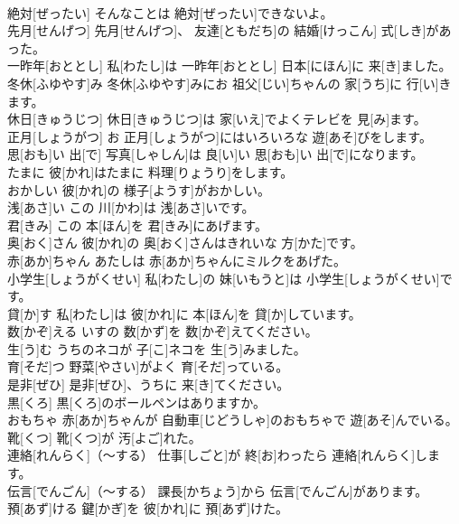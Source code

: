 \documentclass[8pt]{extreport}
\begin{document}
\begin{CJK}{UTF8}{min}
\\	絶対[ぜったい]	そんなことは 絶対[ぜったい]できないよ。		
\\	先月[せんげつ]	先月[せんげつ]、 友達[ともだち]の 結婚[けっこん] 式[しき]があった。		
\\	一昨年[おととし]	私[わたし]は 一昨年[おととし] 日本[にほん]に 来[き]ました。		
\\	冬休[ふゆやす]み	冬休[ふゆやす]みにお 祖父[じい]ちゃんの 家[うち]に 行[い]きます。		
\\	休日[きゅうじつ]	休日[きゅうじつ]は 家[いえ]でよくテレビを 見[み]ます。		
\\	正月[しょうがつ]	お 正月[しょうがつ]にはいろいろな 遊[あそ]びをします。		
\\	思[おも]い 出[で]	写真[しゃしん]は 良[い]い 思[おも]い 出[で]になります。		
\\	たまに	彼[かれ]はたまに 料理[りょうり]をします。		
\\	おかしい	彼[かれ]の 様子[ようす]がおかしい。		
\\	浅[あさ]い	この 川[かわ]は 浅[あさ]いです。		
\\	君[きみ]	この 本[ほん]を 君[きみ]にあげます。		
\\	奥[おく]さん	彼[かれ]の 奥[おく]さんはきれいな 方[かた]です。		
\\	赤[あか]ちゃん	あたしは 赤[あか]ちゃんにミルクをあげた。		
\\	小学生[しょうがくせい]	私[わたし]の 妹[いもうと]は 小学生[しょうがくせい]です。		
\\	貸[か]す	私[わたし]は 彼[かれ]に 本[ほん]を 貸[か]しています。		
\\	数[かぞ]える	いすの 数[かず]を 数[かぞ]えてください。		
\\	生[う]む	うちのネコが 子[こ]ネコを 生[う]みました。		
\\	育[そだ]つ	野菜[やさい]がよく 育[そだ]っている。		
\\	是非[ぜひ]	是非[ぜひ]、うちに 来[き]てください。		
\\	黒[くろ]	黒[くろ]のボールペンはありますか。		
\\	おもちゃ	赤[あか]ちゃんが 自動車[じどうしゃ]のおもちゃで 遊[あそ]んでいる。		
\\	靴[くつ]	靴[くつ]が 汚[よご]れた。		
\\	連絡[れんらく]（～する）	仕事[しごと]が 終[お]わったら 連絡[れんらく]します。		
\\	伝言[でんごん]（～する）	課長[かちょう]から 伝言[でんごん]があります。		
\\	預[あず]ける	鍵[かぎ]を 彼[かれ]に 預[あず]けた。		

\end{CJK}
\end{document}
